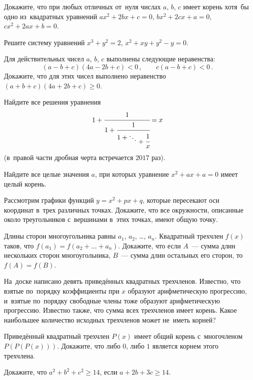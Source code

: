 \begin{problems}

\item
Докажите, что при любых отличных от~нуля числах $a$, $b$, $c$ имеет корень
хотя~бы одно из~квадратных уравнений\enspace
$a x^2 + 2 b x + c = 0$,\enspace
$b x^2 + 2 c x + a = 0$,\enspace
$c x^2 + 2 a x + b = 0$.

\item
Решите систему уравнений\enspace
$x^3 + y^2 = 2$,\enspace
$x^2 + x y + y^2 - y = 0$.

\item
Для действительных чисел $a$, $b$, $c$ выполнены следующие неравенства:
\[
    (a - b + c) (4 a - 2 b + c) < 0
\, , \qquad
    c (a - b + c) < 0
\, . \]
Докажите, что для этих чисел выполнено неравенство
$(a + b + c) (4 a + 2 b + c) \geq 0$.

\item
Найдите все решения уравнения
\[
    1 + \cfrac{1}{1 + \cfrac{1}{1 +
        \raisebox{-1.4ex}{$\raisebox{0.7ex}{$\ddots$} + \cfrac{1}{x}$}}}
=
    x
\]
(в~правой части дробная черта встречается $2017$ раз).

\item
Найдите все целые значения $a$, при которых уравнение $x^2 + a x + a = 0$ имеет
целый корень.

\item
Рассмотрим графики функций $y = x^2 + p x + q$, которые пересекают оси
координат в~трех различных точках.
Докажите, что все окружности, описанные около треугольников с~вершинами в~этих
точках, имеют общую точку.

\item
Длины сторон многоугольника равны $a_{1}$, $a_{2}$, \ldots, $a_{n}$.
Квадратный трехчлен $f(x)$ таков, что $f(a_{1}) = f(a_{2} + \ldots + a_{n})$.
Докажите, что если $A$~--- сумма длин нескольких сторон многоугольника,
$B$~--- сумма длин остальных его сторон, то~$f(A) = f(B)$.

\item
На~доске написано девять приведённых квадратных трехчленов.
Известно, что взятые по~порядку коэффициенты при $x$ образуют арифметическую
прогрессию, и~взятые по~порядку свободные члены тоже образуют арифметическую
прогрессию.
Известно также, что сумма всех трехчленов имеет корень.
Какое наибольшее количество исходных трехчленов может не~иметь корней?

\item
Приведённый квадратный трехчлен $P(x)$ имеет общий корень с~многочленом
$P(P(P(x)))$.
Докажите, что либо $0$, либо $1$ является корнем этого трехчлена.

\item
Докажите, что $a^2 + b^2 + c^2 \geq 14$, если $a + 2 b + 3 c \geq 14$.

\end{problems}

